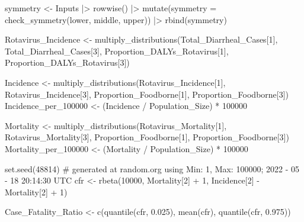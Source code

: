 \documentclass[
  letterpaper,
  DIV=11,
  numbers=noendperiod]{scrartcl}
\newenvironment{Shaded}{\begin{snugshade}}{\end{snugshade}}
\newcommand{\AttributeTok}[1]{\textcolor[rgb]{0.40,0.45,0.13}{#1}}
\newcommand{\CommentTok}[1]{\textcolor[rgb]{0.37,0.37,0.37}{#1}}
\newcommand{\DecValTok}[1]{\textcolor[rgb]{0.68,0.00,0.00}{#1}}
\newcommand{\FloatTok}[1]{\textcolor[rgb]{0.68,0.00,0.00}{#1}}
\newcommand{\FunctionTok}[1]{\textcolor[rgb]{0.28,0.35,0.67}{#1}}
\newcommand{\NormalTok}[1]{\textcolor[rgb]{0.00,0.23,0.31}{#1}}
\newcommand{\OtherTok}[1]{\textcolor[rgb]{0.00,0.23,0.31}{#1}}
\newcommand{\SpecialCharTok}[1]{\textcolor[rgb]{0.37,0.37,0.37}{#1}}
\begin{document}
\begin{Shaded}
\begin{Highlighting}[]
\NormalTok{symmetry }\OtherTok{\textless{}{-}}\NormalTok{ Inputs }\SpecialCharTok{|\textgreater{}}
 \FunctionTok{rowwise}\NormalTok{() }\SpecialCharTok{|\textgreater{}}
 \FunctionTok{mutate}\NormalTok{(}\AttributeTok{symmetry =} \FunctionTok{check\_symmetry}\NormalTok{(lower,  middle,  upper)) }\SpecialCharTok{|\textgreater{}}
 \FunctionTok{rbind}\NormalTok{(symmetry)}

\NormalTok{Rotavirus\_Incidence }\OtherTok{\textless{}{-}} \FunctionTok{multiply\_distributions}\NormalTok{(Total\_Diarrheal\_Cases[}\DecValTok{1}\NormalTok{], Total\_Diarrheal\_Cases[}\DecValTok{3}\NormalTok{],  Proportion\_DALYs\_Rotavirus[}\DecValTok{1}\NormalTok{], Proportion\_DALYs\_Rotavirus[}\DecValTok{3}\NormalTok{])}

\NormalTok{Incidence }\OtherTok{\textless{}{-}} \FunctionTok{multiply\_distributions}\NormalTok{(Rotavirus\_Incidence[}\DecValTok{1}\NormalTok{], Rotavirus\_Incidence[}\DecValTok{3}\NormalTok{],  Proportion\_Foodborne[}\DecValTok{1}\NormalTok{], Proportion\_Foodborne[}\DecValTok{3}\NormalTok{])}
\NormalTok{Incidence\_per\_100000 }\OtherTok{\textless{}{-}}\NormalTok{ (Incidence }\SpecialCharTok{/}\NormalTok{ Population\_Size) }\SpecialCharTok{*} \DecValTok{100000}

\NormalTok{Mortality }\OtherTok{\textless{}{-}} \FunctionTok{multiply\_distributions}\NormalTok{(Rotavirus\_Mortality[}\DecValTok{1}\NormalTok{], Rotavirus\_Mortality[}\DecValTok{3}\NormalTok{],  Proportion\_Foodborne[}\DecValTok{1}\NormalTok{], Proportion\_Foodborne[}\DecValTok{3}\NormalTok{])}
\NormalTok{Mortality\_per\_100000 }\OtherTok{\textless{}{-}}\NormalTok{ (Mortality }\SpecialCharTok{/}\NormalTok{ Population\_Size) }\SpecialCharTok{*} \DecValTok{100000}

\FunctionTok{set.seed}\NormalTok{(}\DecValTok{48814}\NormalTok{) }\CommentTok{\# generated at random.org using Min: 1,  Max: 100000; 2022 {-} 05 {-} 18 20:14:30 UTC}
\NormalTok{cfr }\OtherTok{\textless{}{-}} \FunctionTok{rbeta}\NormalTok{(}\DecValTok{10000}\NormalTok{, Mortality[}\DecValTok{2}\NormalTok{] }\SpecialCharTok{+} \DecValTok{1}\NormalTok{,  Incidence[}\DecValTok{2}\NormalTok{] }\SpecialCharTok{{-}}\NormalTok{ Mortality[}\DecValTok{2}\NormalTok{] }\SpecialCharTok{+} \DecValTok{1}\NormalTok{)}

\NormalTok{Case\_Fatality\_Ratio }\OtherTok{\textless{}{-}} \FunctionTok{c}\NormalTok{(}\FunctionTok{quantile}\NormalTok{(cfr, }\FloatTok{0.025}\NormalTok{), }\FunctionTok{mean}\NormalTok{(cfr), }\FunctionTok{quantile}\NormalTok{(cfr, }\FloatTok{0.975}\NormalTok{))}


\end{Highlighting}
\end{Shaded}
\end{document}
